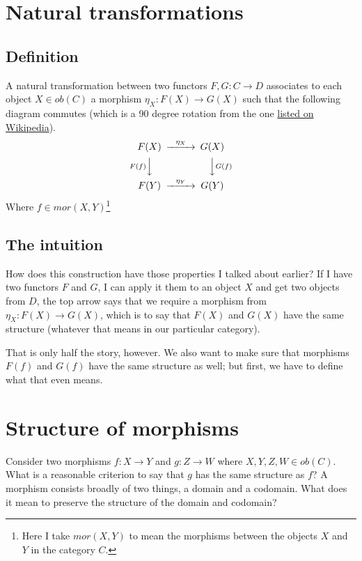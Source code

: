 \documentclass[11pt]{article}
\begin{document}
\section*{Natural transformations}
\label{sec:org55e3d65}
\subsection*{Definition}
\label{sec:orga9692a1}
A natural transformation between two functors \(F,G:C\to D\) associates to each object \(X\in ob(C)\) a morphism \(\eta_X: F(X)\to G(X)\) such that the following diagram
commutes (which is a 90 degree rotation from the one \href{https://en.wikipedia.org/wiki/Natural\_transformation\#Definition}{listed on Wikipedia}).
\[\begin{CD}
F(X) @>\eta_X>> G(X) \\
@VF(f)VV        @VVG(f)V \\
F(Y) @>\eta_Y>> G(Y)
\end{CD} \]
Where \(f\in mor(X,Y)\)\footnote{Here I take \(mor(X,Y)\) to mean the morphisms between the objects \(X\) and \(Y\) in the category \(C\).}

\subsection*{The intuition}
\label{sec:org09fcd79}

How does this construction have those properties I talked about earlier? If I have two functors \(F\) and \(G\), I can apply it them to an object \(X\) and get two objects from \(D\), the top arrow says that
we require a morphism from \(\eta_X:F(X)\to G(X)\), which is to say that \(F(X)\) and \(G(X)\) have the same structure (whatever that means in our particular category).

That is only half the story, however. We also want to make sure that morphisms \(F(f)\) and \(G(f)\) have the same structure as well; but first, we have to define what that even means.

\section*{Structure of morphisms}
\label{sec:org64627bd}
Consider two morphisms \(f: X\to Y\) and \(g: Z\to W\) where \(X,Y,Z,W\in ob(C)\). What is a reasonable criterion to say that \(g\) has the same structure as \(f\)?
A morphism consists broadly of two things, a domain and a codomain. What does it mean to preserve the structure of the domain and codomain?
\end{document}

